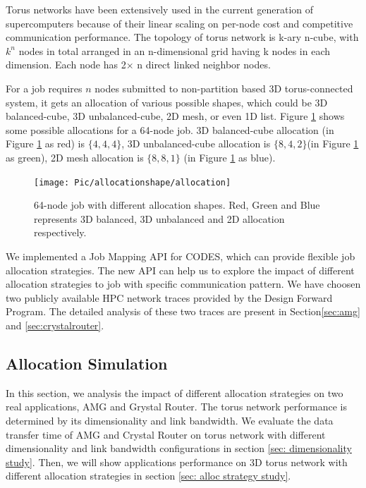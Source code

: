 \documentclass[conference]{IEEEtran}
\begin{document}
Torus networks have been extensively used in the current generation of supercomputers because of their linear scaling on per-node cost and competitive communication performance. The topology of torus network is k-ary n-cube, with $k^n$ nodes in total arranged in an n-dimensional grid having k nodes in each dimension. Each node has 2$\times$ n direct linked neighbor nodes. 

For a job requires $n$ nodes submitted to non-partition based 3D torus-connected system, it gets an allocation of various possible shapes, which could be 3D balanced-cube, 3D unbalanced-cube, 2D mesh, or even 1D list. Figure \ref{fig: allocation} shows some possible allocations for a 64-node job. 3D balanced-cube allocation (in Figure \ref{fig: allocation} as red) is $\{4,4,4\}$, 3D unbalanced-cube allocation is $\{8,4,2\}$(in Figure \ref{fig: allocation} as green), 2D mesh allocation is $\{8,8,1\}$ (in Figure \ref{fig: allocation} as blue).

\begin{figure}[h!] 
  \centering
  \texttt{[image: Pic/allocationshape/allocation]}
  \caption{64-node job with different allocation shapes. Red, Green and Blue represents 3D balanced, 3D unbalanced and 2D allocation respectively. }
  \label{fig: allocation}
\end{figure}

We implemented a Job Mapping API for CODES, which can provide flexible job allocation strategies. The new API can help us to explore the impact of different allocation strategies to job with specific communication pattern. We have choosen two publicly available HPC network traces provided by the Design Forward Program\cite{design forward webpage}. The detailed analysis of these two traces are present in Section\ref{sec:amg} and \ref{sec:crystalrouter}.


\subsection{Allocation Simulation}
\label{sec:alloc sim}

In this section, we analysis the impact of different allocation strategies on two real applications, AMG and Grystal Router. The torus network performance is determined by its dimensionality and link bandwidth. We evaluate the data transfer time of AMG and Crystal Router on torus network with different dimensionality and link bandwidth configurations in section \ref{sec: dimensionality study}. Then, we will show applications performance on 3D torus network with different allocation strategies in section \ref{sec: alloc strategy study}.
\end{document}
